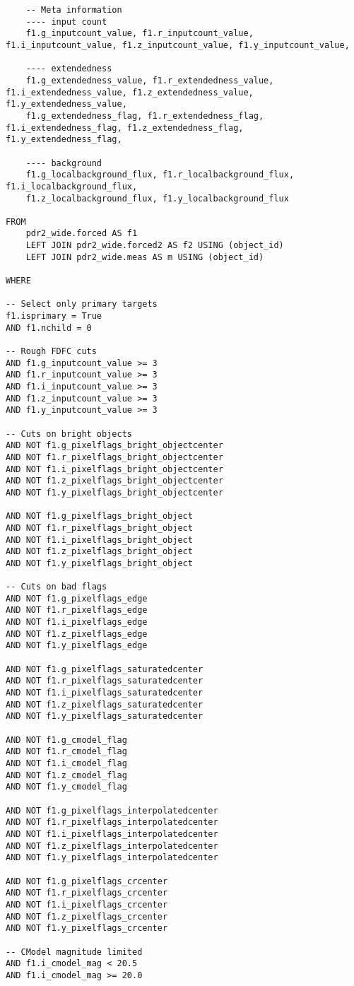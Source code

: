 \documentclass[fleqn,usenatbib,useAMS]{mnras}
\begin{document}
\begin{lstlisting}
    -- Meta information
    ---- input count
    f1.g_inputcount_value, f1.r_inputcount_value, f1.i_inputcount_value, f1.z_inputcount_value, f1.y_inputcount_value,

    ---- extendedness
    f1.g_extendedness_value, f1.r_extendedness_value, f1.i_extendedness_value, f1.z_extendedness_value, f1.y_extendedness_value,
    f1.g_extendedness_flag, f1.r_extendedness_flag, f1.i_extendedness_flag, f1.z_extendedness_flag, f1.y_extendedness_flag,

    ---- background
    f1.g_localbackground_flux, f1.r_localbackground_flux, f1.i_localbackground_flux,
    f1.z_localbackground_flux, f1.y_localbackground_flux
		
FROM
	pdr2_wide.forced AS f1
	LEFT JOIN pdr2_wide.forced2 AS f2 USING (object_id)
	LEFT JOIN pdr2_wide.meas AS m USING (object_id)

WHERE
	
-- Select only primary targets
f1.isprimary = True
AND f1.nchild = 0

-- Rough FDFC cuts
AND f1.g_inputcount_value >= 3
AND f1.r_inputcount_value >= 3
AND f1.i_inputcount_value >= 3
AND f1.z_inputcount_value >= 3
AND f1.y_inputcount_value >= 3

-- Cuts on bright objects
AND NOT f1.g_pixelflags_bright_objectcenter
AND NOT f1.r_pixelflags_bright_objectcenter
AND NOT f1.i_pixelflags_bright_objectcenter
AND NOT f1.z_pixelflags_bright_objectcenter
AND NOT f1.y_pixelflags_bright_objectcenter

AND NOT f1.g_pixelflags_bright_object
AND NOT f1.r_pixelflags_bright_object
AND NOT f1.i_pixelflags_bright_object
AND NOT f1.z_pixelflags_bright_object
AND NOT f1.y_pixelflags_bright_object

-- Cuts on bad flags
AND NOT f1.g_pixelflags_edge
AND NOT f1.r_pixelflags_edge
AND NOT f1.i_pixelflags_edge
AND NOT f1.z_pixelflags_edge
AND NOT f1.y_pixelflags_edge

AND NOT f1.g_pixelflags_saturatedcenter
AND NOT f1.r_pixelflags_saturatedcenter
AND NOT f1.i_pixelflags_saturatedcenter
AND NOT f1.z_pixelflags_saturatedcenter
AND NOT f1.y_pixelflags_saturatedcenter

AND NOT f1.g_cmodel_flag
AND NOT f1.r_cmodel_flag
AND NOT f1.i_cmodel_flag
AND NOT f1.z_cmodel_flag
AND NOT f1.y_cmodel_flag

AND NOT f1.g_pixelflags_interpolatedcenter
AND NOT f1.r_pixelflags_interpolatedcenter
AND NOT f1.i_pixelflags_interpolatedcenter
AND NOT f1.z_pixelflags_interpolatedcenter
AND NOT f1.y_pixelflags_interpolatedcenter

AND NOT f1.g_pixelflags_crcenter
AND NOT f1.r_pixelflags_crcenter
AND NOT f1.i_pixelflags_crcenter
AND NOT f1.z_pixelflags_crcenter
AND NOT f1.y_pixelflags_crcenter

-- CModel magnitude limited
AND f1.i_cmodel_mag < 20.5 
AND f1.i_cmodel_mag >= 20.0
\end{lstlisting}
\end{document}
